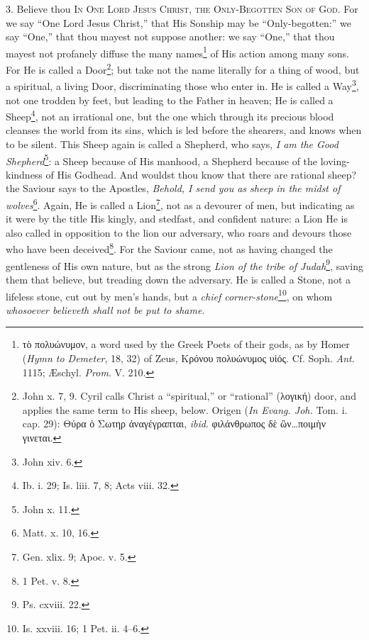 3. Believe thou \textsc{In One Lord Jesus Christ, the Only-Begotten Son of God}. For we say “One Lord Jesus Christ,” that His Sonship may be “Only-begotten:” we say “One,” that thou mayest not suppose another: we say “One,” that thou mayest not profanely diffuse the many names\footnote{\textgreek{τὸ πολυώνυμον}, a word used by the Greek Poets of their gods, as by Homer (\emph{Hymn to Demeter}, 18, 32) of Zeus, \textgreek{Κρόνου πολυώνυμος υἱός}. Cf. Soph. \emph{Ant}. 1115; Æschyl. \emph{Prom}. V. 210.} of His action among many sons. For He is called a Door\footnote{John x. 7, 9. Cyril calls Christ a “spiritual,” or “rational” (\textgreek{λογική}) door, and applies the same term to His sheep, below. Origen (\emph{In Evang. Joh.} Tom. i. cap. 29): \textgreek{Θύρα ὁ Σωτηρ ἀναγέγραπται}, \emph{ibid}. \textgreek{φιλάνθρωπος δὲ ὢν…ποιμὴν γινεται}.}; but take not the name literally for a thing of wood, but a spiritual, a living Door, discriminating those who enter in. He is called a Way\footnote{John xiv. 6.}, not one trodden by feet, but leading to the Father in heaven; He is called a Sheep\footnote{Ib. i. 29; Is. liii. 7, 8; Acts viii. 32.}, not an irrational one, but the one which through its precious blood cleanses the world from its sins, which is led before the shearers, and knows when to be silent. This Sheep again is called a Shepherd, who says, \emph{I am the Good Shepherd}\footnote{John x. 11.}: a Sheep because of His manhood, a Shepherd because of the loving-kindness of His Godhead. And wouldst thou know that there are rational sheep? the Saviour says to the Apostles, \emph{Behold, I send you as sheep in the midst of wolves}\footnote{Matt. x. 10, 16.}. Again, He is called a Lion\footnote{Gen. xlix. 9; Apoc. v. 5.}, not as a devourer of men, but indicating as it were by the title His kingly, and stedfast, and confident nature: a Lion He is also called in opposition to the lion our adversary, who roars and devours those who have been deceived\footnote{1 Pet. v. 8.}. For the Saviour came, not as having changed the gentleness of His own nature, but as the strong \emph{Lion of the tribe of Judah}\footnote{Ps. cxviii. 22.}, saving them that believe, but treading down the adversary. He is called a Stone, not a lifeless stone, cut out by men’s hands, but a \emph{chief corner-stone}\footnote{Is. xxviii. 16; 1 Pet. ii. 4–6.}, on whom \emph{whosoever believeth shall not be put to shame}.


